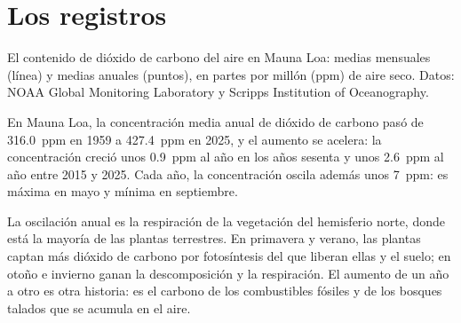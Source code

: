 \section{Los registros}

\begin{omfigure}

{\small El contenido de dióxido de carbono del aire en Mauna Loa: medias mensuales
(línea) y medias anuales (puntos), en partes por millón (ppm) de aire seco.
Datos: NOAA Global Monitoring Laboratory y Scripps Institution of
Oceanography.}
\end{omfigure}

\begin{proposition}\label{prop:g12:climate-change:co2}
En Mauna Loa, la concentración media anual de dióxido de carbono pasó de
\qty{316.0}{ppm} en 1959 a \qty{427.4}{ppm} en 2025, y el aumento se
acelera: la concentración creció unos \qty{0.9}{ppm} al año en
los años sesenta y unos \qty{2.6}{ppm} al año entre 2015 y 2025. Cada
año, la concentración oscila además unos \qty{7}{ppm}: es máxima en
mayo y mínima en septiembre.
\end{proposition}

\begin{remark}\label{rem:g12:climate-change:teeth}
La oscilación anual es la respiración de la vegetación del hemisferio
norte, donde está la mayoría de las plantas terrestres. En primavera y verano, las plantas captan
más dióxido de carbono por fotosíntesis del que liberan ellas y el suelo;
en otoño e invierno ganan la descomposición y la respiración. El aumento de un año
a otro es otra historia: es el carbono de los combustibles fósiles y de los bosques
talados que se acumula en el aire.
\end{remark}

